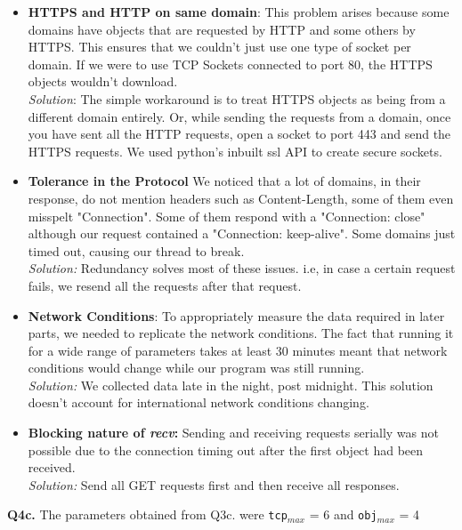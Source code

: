 \documentclass[12pt]{article}
\begin{document}
\begin{itemize}
\item \textbf{HTTPS and HTTP on same domain}: This problem arises because some domains have objects that are requested by HTTP and some others by HTTPS. This ensures that we couldn't just use one type of socket per domain. If we were to use TCP Sockets connected to port 80, the HTTPS objects wouldn't download.\\
\textit{Solution}: The simple workaround is to treat HTTPS objects as being from a different domain entirely. Or, while sending the requests from a domain, once you have sent all the HTTP requests, open a socket to port 443 and send the HTTPS requests. We used python's inbuilt ssl API to create secure sockets.
\item \textbf{Tolerance in the Protocol} We noticed that a lot of domains, in their response, do not mention headers such as Content-Length, some of them even misspelt "Connection". Some of them respond with a "Connection: close" although our request contained a "Connection: keep-alive". Some domains just timed out, causing our thread to break.
\\\textit{Solution:} Redundancy solves most of these issues. i.e, in case a certain request fails, we resend all the requests after that request.
\item \textbf{Network Conditions}: To appropriately measure the data required in later parts, we needed to replicate the network conditions. The fact that running it for a wide range of parameters takes at least 30 minutes meant that network conditions would change while our program was still running. \\
\textit{Solution:} We collected data late in the night, post midnight. This solution doesn't account for international network conditions changing.
\item \textbf{Blocking nature of \emph{recv}:} Sending and receiving requests serially was not possible due to the connection timing out after the first object had been received.\\\emph{Solution:} Send all GET requests first and then receive all responses.
\end{itemize}
{\bfseries Q4c.} The parameters obtained from Q3c. were \texttt{tcp$_{max}$} = 6 and \texttt{obj$_{max}$} = 4
\end{document}
